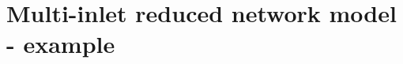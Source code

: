 \chapter{Multi-inlet reduced network model - example}
\label{multi_inlet_network_model_simple_example}